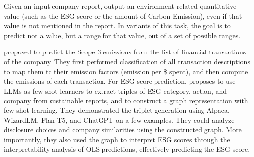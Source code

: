 
\task Given an input company report, output an environment-related quantitative value (such as the ESG score or the amount of Carbon Emission), even if that value is not mentioned in the report. In variants of this task, the goal is to predict not a value, but a range for that value, out of a set of possible ranges. 


\zeroshot \citet{jain_supply_2023} proposed to predict the Scope 3 emissions %
from the list of financial transactions of the company. They first performed classification of all transaction descriptions to map them to their emission factors (emission per \$ spent), and then compute the emissions of each transaction. For ESG score prediction, \citet{bronzini_glitter_2023} proposes to use LLMs as few-shot learners to extract triples of ESG category, action, and company from sustainable reports, and to construct a graph representation with few-shot learning. They demonstrated the triplet generation using Alpaca, WizardLM, Flan-T5, and ChatGPT on a few examples. They could analyze disclosure choices and company similarities using the constructed graph. More importantly, they also used the graph to interpret ESG scores through the interpretability analysis of OLS predictions, effectively predicting the ESG score. 

